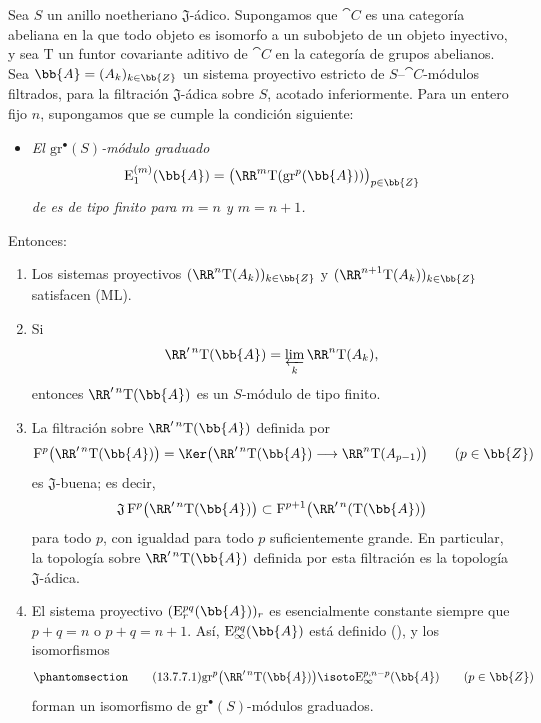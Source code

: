 \documentclass[oneside]{amsart}
\newcommand{\oldpage}[2][]{{\marginnote{\normalfont\textbf{#1}~|~#2}}\ignorespaces}
\let\EGAOriginalLabel\label
\renewcommand{\label}[1]{\phantomsection\EGAOriginalLabel{#1}}
\begin{document}
\begin{proposition}[13.7.7]
\label{0.13.7.7}
Sea $S$ un anillo noetheriano $\mathfrak{J}$-ádico.
Supongamos que $\cat{C}$ es una categoría abeliana en la que todo objeto
es isomorfo a un subobjeto de un objeto inyectivo, y sea
$\mathrm{T}$ un funtor covariante aditivo de $\cat{C}$ en la
categoría de grupos abelianos.
Sea $\bb{A}=(A_k)_{k\in\bb{Z}}$ un
\oldpage[0\textsubscript{III}]{78}
sistema proyectivo estricto de $S$--$\cat{C}$-módulos filtrados, para la
filtración $\mathfrak{J}$-ádica sobre $S$, acotado inferiormente.
Para un entero fijo $n$, supongamos que se cumple la condición siguiente:
\begin{itemize}
  \item[$(\mathrm{F}_n)$]
  \emph{El $\mathrm{gr}^\bullet(S)$-módulo graduado}
  \[
    \mathrm{E}_1^{(m)}(\bb{A})
    =
    \bigl(
      \RR^m\mathrm{T}(\mathrm{gr}^p(\bb{A}))
    \bigr)_{p\in\bb{Z}}
  \]
  \emph{de  es de tipo finito para
  $m=n$ y $m=n+1$.}
\end{itemize}
Entonces:
\begin{enumerate}
  \item[{\rm(i)}] Los sistemas proyectivos
  $(\RR^n\mathrm{T}(A_k))_{k\in\bb{Z}}$ y
  $(\RR^{n+1}\mathrm{T}(A_k))_{k\in\bb{Z}}$ satisfacen {\rm(ML)}.
  \item[{\rm(ii)}] Si
  \[
    \RR'^{\,n}\mathrm{T}(\bb{A})
    =
    \varprojlim_k\RR^n\mathrm{T}(A_k),
  \]
  entonces $\RR'^{\,n}\mathrm{T}(\bb{A})$ es un $S$-módulo de tipo
  finito.
  \item[{\rm(iii)}] La filtración sobre
  $\RR'^{\,n}\mathrm{T}(\bb{A})$ definida por
  \[
    \mathrm{F}^p\bigl(\RR'^{\,n}\mathrm{T}(\bb{A})\bigr)
    =
    \Ker\bigl(
      \RR'^{\,n}\mathrm{T}(\bb{A})
      \longrightarrow
      \RR^n\mathrm{T}(A_{p-1})
    \bigr)
    \qquad(p\in\bb{Z})
  \]
  es $\mathfrak{J}$-buena; es decir,
  \[
    \mathfrak{J}\,
    \mathrm{F}^p\bigl(\RR'^{\,n}\mathrm{T}(\bb{A})\bigr)
    \subset
    \mathrm{F}^{p+1}\bigl(\RR'^{\,n}(\mathrm{T}(\bb{A})\bigr)
  \]
  para todo $p$, con igualdad para todo $p$ suficientemente grande.
  En particular, la topología sobre
  $\RR'^{\,n}\mathrm{T}(\bb{A})$ definida por esta filtración es la
  topología $\mathfrak{J}$-ádica.
  \item[{\rm(iv)}] El sistema proyectivo
  $(\mathrm{E}_r^{pq}(\bb{A}))_r$ es esencialmente constante siempre que
  $p+q=n$ o $p+q=n+1$.
  Así, $\mathrm{E}_\infty^{pq}(\bb{A})$ está definido
  \textup{()}, y los isomorfismos
  \begin{equation}
  \label{0.13.7.7.1}
  \tag{13.7.7.1}
    \mathrm{gr}^p\bigl(\RR'^{\,n}\mathrm{T}(\bb{A})\bigr)
    \isoto
    \mathrm{E}_\infty^{p,n-p}(\bb{A})
    \qquad(p\in\bb{Z})
  \end{equation}
  forman un isomorfismo de
  $\mathrm{gr}^\bullet(S)$-módulos graduados.
\end{enumerate}
\end{proposition}
\end{document}
